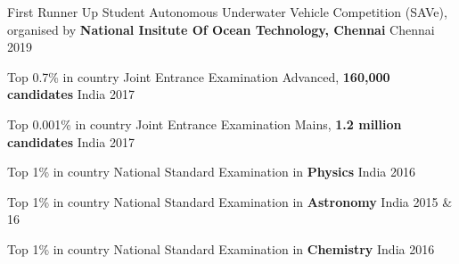 
\begin{cvhonors}
  \cvhonor
    {First Runner Up}
    {Student Autonomous Underwater Vehicle Competition (SAVe), \break organised by\textbf{ National Insitute Of Ocean Technology, Chennai}} 
    {Chennai} 
    {2019}
 
  \cvhonor
    {Top 0.7\% in country}
    {Joint Entrance Examination Advanced, \textbf{160,000 candidates}} 
    {India} 
    {2017}

  \cvhonor
    {Top 0.001\% in country} 
    {Joint Entrance Examination Mains, \textbf{1.2 million candidates}} 
    {India}
    {2017}

 \cvhonor
    {Top 1\% in country}  
    {National Standard Examination in \textbf{Physics}}
    {India}
    {2016}
 
 \cvhonor
    {Top 1\% in country} 
    {National Standard Examination in \textbf{Astronomy}}
    {India}
    {2015 \& 16}
  
  \cvhonor
    {Top 1\% in country} 
    {National Standard Examination in \textbf{Chemistry}}
    {India}
    {2016}
 
\end{cvhonors}